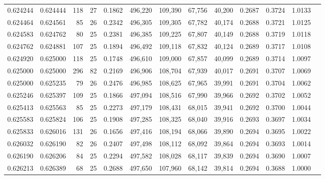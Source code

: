 \begin{tabular}{rrrrrrrrrrrrr}
0.624244 & 0.624444 &    118 &    27 &                                     0.1862 & 496,220 & 109,390 &  67,756 &  40,200 & 0.2687 & 0.3724 & 1.0133 \\
0.624464 & 0.624561 &     85 &    26 &                                     0.2342 & 496,305 & 109,305 &  67,782 &  40,174 & 0.2688 & 0.3721 & 1.0125 \\
0.624583 & 0.624762 &     80 &    25 &                                     0.2381 & 496,385 & 109,225 &  67,807 &  40,149 & 0.2688 & 0.3719 & 1.0118 \\
0.624762 & 0.624881 &    107 &    25 &                                     0.1894 & 496,492 & 109,118 &  67,832 &  40,124 & 0.2689 & 0.3717 & 1.0108 \\
0.624920 & 0.625000 &    118 &    25 &                                     0.1748 & 496,610 & 109,000 &  67,857 &  40,099 & 0.2689 & 0.3714 & 1.0097 \\
0.625000 & 0.625000 &    296 &    82 &                                     0.2169 & 496,906 & 108,704 &  67,939 &  40,017 & 0.2691 & 0.3707 & 1.0069 \\
0.625000 & 0.625235 &     79 &    26 &                                     0.2476 & 496,985 & 108,625 &  67,965 &  39,991 & 0.2691 & 0.3704 & 1.0062 \\
0.625246 & 0.625397 &    109 &    25 &                                     0.1866 & 497,094 & 108,516 &  67,990 &  39,966 & 0.2692 & 0.3702 & 1.0052 \\
0.625413 & 0.625563 &     85 &    25 &                                     0.2273 & 497,179 & 108,431 &  68,015 &  39,941 & 0.2692 & 0.3700 & 1.0044 \\
0.625583 & 0.625824 &    106 &    25 &                                     0.1908 & 497,285 & 108,325 &  68,040 &  39,916 & 0.2693 & 0.3697 & 1.0034 \\
0.625833 & 0.626016 &    131 &    26 &                                     0.1656 & 497,416 & 108,194 &  68,066 &  39,890 & 0.2694 & 0.3695 & 1.0022 \\
0.626032 & 0.626190 &     82 &    26 &                                     0.2407 & 497,498 & 108,112 &  68,092 &  39,864 & 0.2694 & 0.3693 & 1.0014 \\
0.626190 & 0.626206 &     84 &    25 &                                     0.2294 & 497,582 & 108,028 &  68,117 &  39,839 & 0.2694 & 0.3690 & 1.0007 \\
0.626213 & 0.626389 &     68 &    25 &                                     0.2688 & 497,650 & 107,960 &  68,142 &  39,814 & 0.2694 & 0.3688 & 1.0000 \\

\end{tabular}
